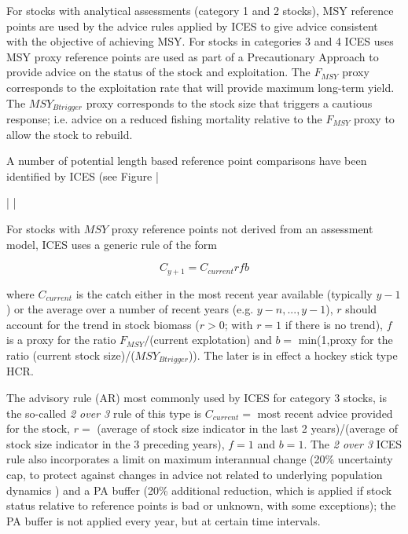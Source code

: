 
For stocks with analytical assessments (category 1 and 2 stocks), MSY reference points are used by the advice rules applied by ICES to give advice consistent with the objective of achieving MSY. For stocks in categories 3 and 4 ICES uses MSY proxy reference points are used as part of a Precautionary Approach to provide advice on the status of the stock and exploitation. The $F_{MSY}$ proxy corresponds to the exploitation rate that will provide maximum long-term yield. The $MSY_{Btrigger}$ proxy corresponds to the stock size that triggers a cautious response; i.e. advice on a reduced fishing mortality relative to the $F_{MSY}$ proxy to allow the stock to rebuild. 

A number of potential length based reference point comparisons have been identified by ICES (see Figure |%


|%
|%

For stocks with $MSY$ proxy reference points not derived from an assessment model, ICES uses a generic rule of the form 
 
\begin{equation}
C_{y+1}=C_{current}rfb
 \end{equation}

where $C_{current}$ is the catch either in the most recent year available (typically $y-1$) or the average over a number of recent years (e.g. 
$y-n, ... ,y-1$), $r$ should account for the trend in stock biomass ($r>0$; with $r=1$ if there is no trend), $f$  is a proxy for the ratio $F_{MSY}/$(current explotation) and $b=$ min(1,proxy for the ratio (current stock size)/($MSY_{Btrigger}$)). The later is in effect a hockey stick type HCR. 


The advisory rule (AR) most commonly used by ICES for category 3 stocks, is the so-called \textit{2 over 3} rule of this type is $C_{current}=$ most recent advice provided for the stock, $r=$ (average of stock size indicator in the last 2 years)/(average of stock size indicator in the 3 preceding years), $f=1$ and $b=1$. The \textit{2 over 3} ICES rule also incorporates  a  limit  on  maximum  interannual  change  (20\%  uncertainty  cap,  to  protect  against  changes  in  advice  not  related  to  underlying  population  dynamics )  and  a  PA buffer (20\% additional reduction, which is applied if stock status relative to reference 
points is bad or unknown, with some exceptions); the PA buffer is not applied every year, but at certain time intervals.

